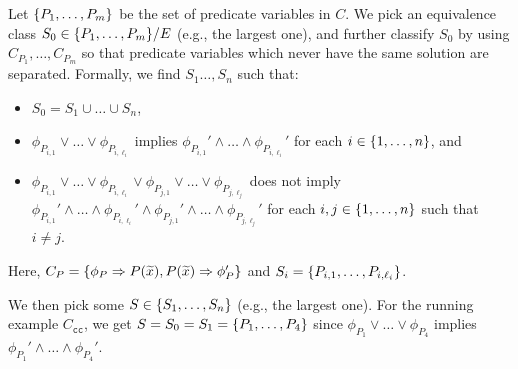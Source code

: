 
Let \(\{{P_1,\dots,P_m}\}\) be the set of predicate variables in \(C\).
We pick an equivalence class \(S_0 \in \{{P_1,\dots,P_m}\} / E\) (e.g., 
the largest one), and further classify \(S_0\) by using 
\(C_{P_1},\dots,C_{P_m}\) so that predicate variables which never have 
the same solution are separated.
%
Formally, we find \(S_1\dots,S_n\) such that:
\begin{itemize}
\item \(S_0 = S_1 \cup \dots \cup S_n\),
\item \(\phi_{P_{i,1}} \lor \dots \lor\phi_{P_{i,\ell_i}}\) implies 
\(\phi_{P_{i,1}}' \land \dots \land\phi_{P_{i,\ell_i}}'\) for each \(i 
\in \{{1,\dots,n}\}\), and 
\item \(\phi_{P_{i,1}} \lor \dots \lor\phi_{P_{i,\ell_i}} \lor 
\phi_{P_{j,1}} \lor \dots \lor\phi_{P_{j,\ell_j}}\) does not imply 
\(\phi_{P_{i,1}}' \land \dots \land\phi_{P_{i,\ell_i}}' \land 
\phi_{P_{j,1}}' \land \dots \land\phi_{P_{j,\ell_j}}'\) for each \(i,j 
\in \{{1,\dots,n}\}\) such that \(i \neq j\).
\end{itemize}
Here, \(C_{P}=\{{\phi_{P} \Rightarrow P(\widetilde{x}),P(\widetilde{x}) \Rightarrow 
\phi_{P}'}\}\) and \(S_i=\{{P_{i,1},\dots,P_{i,\ell_i}}\}\).

We then pick some \(S \in \{{S_1,\dots,S_n}\}\) (e.g., the largest one). 
 For the running example \(C_{\texttt{cc}}\), we get 
\(S=S_0=S_1=\{{P_1,\dots,P_4}\}\) since \(\phi_{P_1} \lor \dots 
\lor\phi_{P_4}\) implies \(\phi_{P_1}' \land \dots \land \phi_{P_4}'\).

